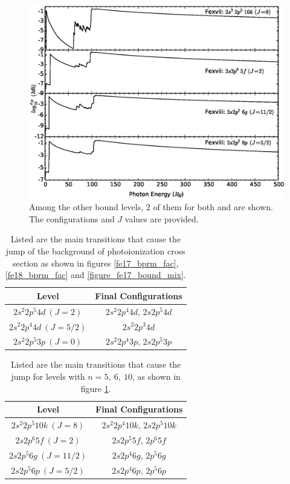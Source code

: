 \begin{figure}
	\centering
	\includegraphics[width=.9\textwidth]{figures/other_levels.eps}
	\caption{Among the other bound levels, 2 of them for both  and  are shown. The configurations and $J$ values are provided. }
	\label{figure_other_levels}
\end{figure}

\begin{table}
	\centering
	\caption{Listed are the main transitions that cause the jump of the background of photoionization cross section as shown in figures \ref{fe17_bprm_fac}, \ref{fe18_bprm_fac} and \ref{figure_fe17_bound_mix}.}
	\begin{tabular} { | c | c |}
		\hline
		Level & Final Configurations \\
		\hline
		$2s^2 2p^5 4d~(J=2)$ & $2s^2 2p^4 4d$, $2s 2p^5 4d$\\
		$2s^2 2p^4 4d~(J=5/2)$ & $2s^2 2p^3 4d$\\
		$2s^2 2p^5 3p~(J=0)$ & $2s^2 2p^4 3p$, $2s 2p^5 3p$\\
		\hline	  								   
	\end{tabular}
	\label{table_n3_n4_jumps}
\end{table}

\begin{table}
	\centering
	\caption{Listed are the main transitions that cause the jump for levels with $n=5,~6,~10$, as shown in figure \ref{figure_other_levels}.}
	\begin{tabular} { | c | c |}
		\hline
		Level & Final Configurations \\
		\hline
		$2s^2 2p^5 10k~(J=8)$ & $2s^2 2p^4 10k$, $2s 2p^5 10k$\\
		$2s 2p^6 5f~(J=2)$ & $2s 2p^5 5f$, $2p^6 5f$\\
		$2s 2p^5 6g~(J=11/2)$ & $2s 2p^4 6g$, $2p^5 6g$\\
		$2s 2p^5 6p~(J=5/2)$ & $2s 2p^4 6p$, $2p^5 6p$\\
		\hline	  								   
	\end{tabular}
	\label{table_n5_n6_jumps}
\end{table}

